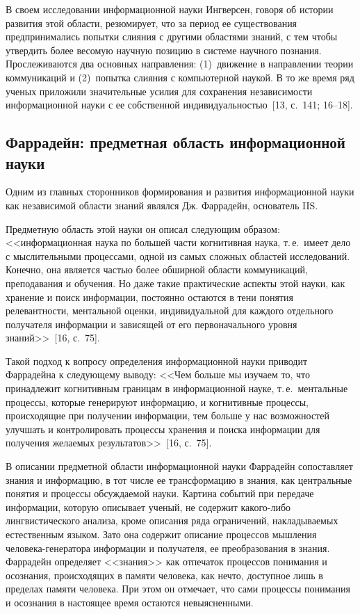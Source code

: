 \begin{multicols}{2}
      В своем исследовании информационной науки Ингверсен, говоря об истории развития
этой области, резюмирует, что за период ее существования предпринимались попытки слияния
с другими областями знаний, с тем чтобы утвердить более весомую научную позицию в
системе научного познания. Прослеживаются два основных направления: (1)~движение в
направлении теории коммуникаций и (2)~попытка слияния с компьютерной наукой. В то же
время ряд ученых приложили значительные усилия для сохранения независимости
информационной науки с ее собственной инди\-ви\-ду\-аль\-ностью~[13, с.~141;
16--18].

\subsection{Фаррадейн: предметная область информационной науки} %

      Одним из главных сторонников формирования и развития информационной науки как
независимой области знаний являлся Дж. Фаррадейн, основатель IIS.

      Предметную область этой науки он описал следующим образом: <<информационная
наука по большей части когнитивная наука, т.\,е.\ имеет дело с мыс\-ли\-тель\-ны\-ми процессами,
одной из самых сложных областей исследований. Конечно, она является частью более
обширной области коммуникаций, преподавания и обучения. Но даже такие практические
аспекты этой науки, как хранение и поиск информации, постоянно остаются в тени понятия
релевантности, ментальной оценки, индивидуальной для каждого отдельного получателя
информации и зависящей от его первоначального уровня знаний>>~[16, с.~75].

      Такой подход к вопросу определения информационной науки приводит Фаррадейна к
следующему выводу: <<Чем больше мы изучаем то, что принадлежит когнитивным границам в
информационной науке, т.\,е.\ ментальные процессы, которые генерируют информацию, и
когнитивные процессы, происходящие при получении информации, тем больше у нас
возможностей улучшать и контролировать процессы хранения и поиска информации для
получения желаемых результатов>>~[16, с.~75].

      В описании предметной области информационной науки Фаррадейн сопоставляет знания
и информацию, в тот числе ее трансформацию в знания, как центральные понятия и процессы
обсуждаемой науки. Картина событий при передаче информации, которую описывает ученый,
не содержит какого-либо лингвистического анализа, кроме описания ряда ограничений,
накладываемых естественным языком. Зато она содержит описание процессов мышления
человека-генератора информации и получателя, ее преобразования в знания. Фаррадейн
определяет <<знания>> как отпечаток процессов понимания и осознания, происходящих в
памяти человека, как нечто, доступное лишь в пределах памяти человека. При этом он
отмечает, что сами процессы понимания и осознания в настоящее время остаются
невыясненными.


\end{multicols}
